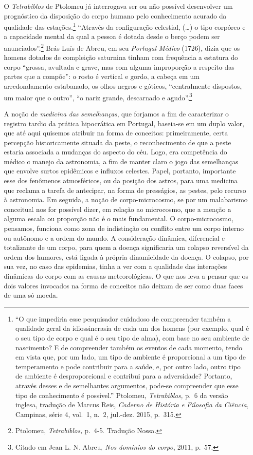 O \textit{Tetrabiblos} de Ptolomeu já interrogava ser ou não possível
desenvolver um prognóstico da disposição do corpo humano pelo
conhecimento acurado da qualidade das estações.\footnote{``O que
  impediria esse pesquisador cuidadoso de compreender também a qualidade
  geral da idiossincrasia de cada um dos homens (por exemplo, qual é o
  seu tipo de corpo e qual é o seu tipo de alma), com base no seu
  ambiente de nascimento? E de compreender também os eventos de cada
  momento, tendo em vista que, por um lado, um tipo de ambiente é
  proporcional a um tipo de temperamento e pode contribuir para a saúde,
  e, por outro lado, outro tipo de ambiente é desproporcional e
  contribui para a adversidade? Portanto, através desses e de
  semelhantes argumentos, pode-se compreender que esse tipo de
  conhecimento é possível.'' Ptolomeu, \textit{Tetrabiblos,} p.~6 da
  versão inglesa, tradução de Marcus Reis, \textit{Caderno de História e
  Filosofia da Ciência}, Campinas, série 4, vol.~1, n.~2, jul.-dez.
  2015, p.~315.} ``Através da configuração celestial, (\ldots{}) o tipo
corpóreo e a capacidade mental da qual a pessoa é dotada desde o berço
podem ser anunciados''.\footnote{Ptolomeu, \textit{Tetrabiblos,} p.~4-5.
  Tradução Nossa.} Brás Luís de Abreu, em seu \textit{Portugal Médico}
(1726), dizia que os homens dotados de compleição saturnina tinham com
frequência a estatura do corpo ``grossa, avultada e grave, mas com
alguma improporção a respeito das partes que a compõe'': o rosto é
vertical e gordo, a cabeça em um arredondamento estabanado, os olhos
negros e góticos, ``centralmente dispostos, um maior que o outro'', ``o
nariz grande, descarnado e agudo''.\footnote{Citado em Jean L. N. Abreu,
  \textit{Nos domínios do corpo}, 2011, p.~57.}

A noção de \textit{medicina das semelhanças}, que forjamos a fim de
caracterizar o registro tardio da prática hipocrática em Portugal,
baseia-se em um duplo valor, que até aqui quisemos atribuir na forma de
conceitos: primeiramente, certa percepção historicamente situada da
peste, o reconhecimento de que a peste estaria associada a mudanças do
aspecto do céu. Logo, era competência do médico o manejo da astronomia,
a fim de manter claro o jogo das semelhanças que envolve surtos
epidêmicos e influxos celestes. Papel, portanto, importante esse dos
fenômenos atmosféricos, ou da posição dos astros, para uma medicina que
reclama a tarefa de antecipar, na forma de presságios, as pestes, pelo
recurso à astronomia. Em seguida, a noção de corpo-microcosmo, se por um
malabarismo conceitual nos for possível dizer, em relação ao microcosmo,
que a menção a alguma escala ou proporção não é o mais fundamental. O
corpo-microcosmo, pensamos, funciona como zona de indistinção ou
conflito entre um corpo interno ou autônomo e a ordem do mundo. A
consideração dinâmica, diferencial e totalizante de um corpo, para quem
a doença significaria um colapso reversível da ordem dos humores, está
ligada à própria dinamicidade da doença. O colapso, por sua vez, no caso
das epidemias, tinha a ver com a qualidade das interações dinâmicas do
corpo com as causas meteorológicas. O que nos leva a pensar que os dois
valores invocados na forma de conceitos não deixam de ser como duas
faces de uma só moeda.

